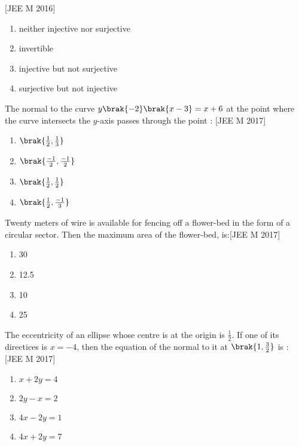 \hfill[JEE M 2016]\\
\begin{enumerate}
    \item  neither injective nor surjective\\
    \item  invertible\\
    \item  injective but not surjective\\
    \item  surjective but not injective\\
\end{enumerate}
\item The normal to the curve $y\brak{-2}\brak{x-3}=x+6$ at the point where the curve intersects the $y$-axis passes through the point : \hfill[JEE M 2017]
\begin{enumerate}
    \item  $\brak{\frac{1}{2}, \frac{1}{3}}$\\
    \item  $\brak{\frac{-1}{2}, \frac{-1}{2}}$\\
    \item  $\brak{\frac{1}{2}, \frac{1}{2}}$\\
    \item  $\brak{\frac{1}{2}, \frac{-1}{3}}$\\
\end{enumerate}
\item Twenty meters of wire is available for fencing off a flower-bed in the form of a circular sector. Then the maximum area of the flower-bed, is:\hfill[JEE M 2017]\\
\begin{enumerate}
    \item  30\\
    \item  12.5\\
    \item  10\\
    \item  25\\
\end{enumerate}
\item The eccentricity of an ellipse whose centre is at the origin is $\frac{1}{2}$. If one of its directices is $x=-4$, then the equation of the normal to it at $\brak{1, \frac{3}{2}}$ is :\hfill[JEE M 2017]\\
\begin{enumerate}
    \item  $x+2y=4$\\
    \item  $2y-x=2$\\
    \item  $4x-2y=1$\\
    \item  $4x+2y=7$\\
\end{enumerate}
